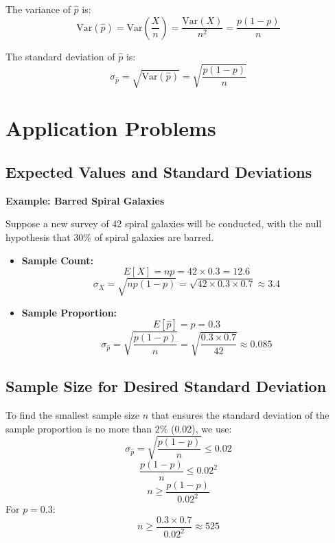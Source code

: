 \documentclass{article}
\begin{document}
The variance of \( \hat{p} \) is:
\[
\text{Var}(\hat{p}) = \text{Var}\left(\frac{X}{n}\right) = \frac{\text{Var}(X)}{n^2} = \frac{p(1 - p)}{n}
\]

The standard deviation of \( \hat{p} \) is:
\[
\sigma_{\hat{p}} = \sqrt{\text{Var}(\hat{p})} = \sqrt{\frac{p(1 - p)}{n}}
\]

\section{Application Problems}

\subsection{Expected Values and Standard Deviations}
\textbf{Example: Barred Spiral Galaxies}

Suppose a new survey of 42 spiral galaxies will be conducted, with the null hypothesis that 30\% of spiral galaxies are barred.

\begin{itemize}
    \item \textbf{Sample Count:}
    \[
    E[X] = np = 42 \times 0.3 = 12.6
    \]
    \[
    \sigma_X = \sqrt{np(1 - p)} = \sqrt{42 \times 0.3 \times 0.7} \approx 3.4
    \]

    \item \textbf{Sample Proportion:}
    \[
    E[\hat{p}] = p = 0.3
    \]
    \[
    \sigma_{\hat{p}} = \sqrt{\frac{p(1 - p)}{n}} = \sqrt{\frac{0.3 \times 0.7}{42}} \approx 0.085
    \]
\end{itemize}

\subsection{Sample Size for Desired Standard Deviation}
To find the smallest sample size \( n \) that ensures the standard deviation of the sample proportion is no more than 2\% (0.02), we use:
\[
\sigma_{\hat{p}} = \sqrt{\frac{p(1 - p)}{n}} \leq 0.02
\]
\[
\frac{p(1 - p)}{n} \leq 0.02^2
\]
\[
n \geq \frac{p(1 - p)}{0.02^2}
\]
For \( p = 0.3 \):
\[
n \geq \frac{0.3 \times 0.7}{0.02^2} \approx 525
\]
\end{document}
